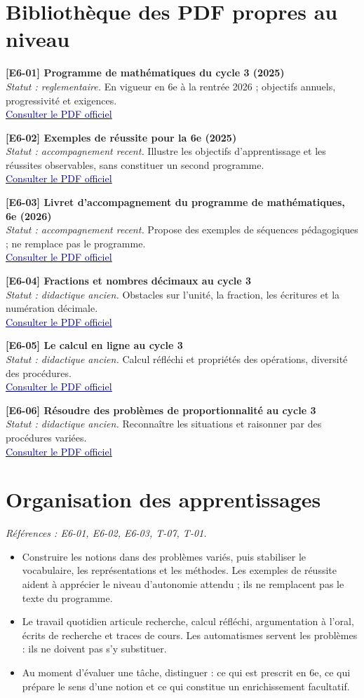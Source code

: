 \documentclass[11pt,a4paper]{article}
\newcommand{\refsource}[1]{\textsf{\textcolor{slate}{[#1]}}}
\newcommand{\sectionref}[2]{\section{#1}\textit{Références : #2.}\par}
\newcommand{\entreesource}[5]{\par\noindent\textbf{\refsource{#1} #2}\\[-2pt]\textit{Statut : #3.} #4\\[-2pt]\href{#5}{\textcolor{navy}{\underline{Consulter le PDF officiel}}}\par\smallskip}
\begin{document}
\section{Bibliothèque des PDF propres au niveau}
\entreesource{E6-01}{Programme de mathématiques du cycle 3 (2025)}{reglementaire}{En vigueur en 6e à la rentrée 2026 ; objectifs annuels, progressivité et exigences.}{https://www.education.gouv.fr/sites/default/files/programme-de-math-matiques-pour-le-cycle-3-439827.pdf}
\entreesource{E6-02}{Exemples de réussite pour la 6e (2025)}{accompagnement recent}{Illustre les objectifs d’apprentissage et les réussites observables, sans constituer un second programme.}{https://eduscol.education.gouv.fr/sites/default/files/document/exemplesmiseenoeuvre6e-mathpdf-111549.pdf}
\entreesource{E6-03}{Livret d’accompagnement du programme de mathématiques, 6e (2026)}{accompagnement recent}{Propose des exemples de séquences pédagogiques ; ne remplace pas le programme.}{https://eduscol.education.gouv.fr/sites/default/files/document/2026livretaccompagnementmaths6e-pdf-126656.pdf}
\entreesource{E6-04}{Fractions et nombres décimaux au cycle 3}{didactique ancien}{Obstacles sur l’unité, la fraction, les écritures et la numération décimale.}{https://eduscol.education.gouv.fr/sites/default/files/document/ra16c3mathfracdecdocmaitrev2681601pdf-76887.pdf}
\entreesource{E6-05}{Le calcul en ligne au cycle 3}{didactique ancien}{Calcul réfléchi et propriétés des opérations, diversité des procédures.}{https://eduscol.education.gouv.fr/sites/default/files/document/ra16c3mathcalcullignec3nd601002pdf-76884.pdf}
\entreesource{E6-06}{Résoudre des problèmes de proportionnalité au cycle 3}{didactique ancien}{Reconnaître les situations et raisonner par des procédures variées.}{https://eduscol.education.gouv.fr/sites/default/files/document/ra16c3mathdocmaitreproportnd576955pdf-76899.pdf}
\sectionref{Organisation des apprentissages}{E6-01, E6-02, E6-03, T-07, T-01}
\begin{itemize}
\item Construire les notions dans des problèmes variés, puis stabiliser le vocabulaire, les représentations et les méthodes. Les exemples de réussite aident à apprécier le niveau d’autonomie attendu ; ils ne remplacent pas le texte du programme.
\item Le travail quotidien articule recherche, calcul réfléchi, argumentation à l’oral, écrits de recherche et traces de cours. Les automatismes servent les problèmes : ils ne doivent pas s’y substituer.
\item Au moment d’évaluer une tâche, distinguer : ce qui est prescrit en 6e, ce qui prépare le sens d’une notion et ce qui constitue un enrichissement facultatif.
\end{itemize}
\end{document}
